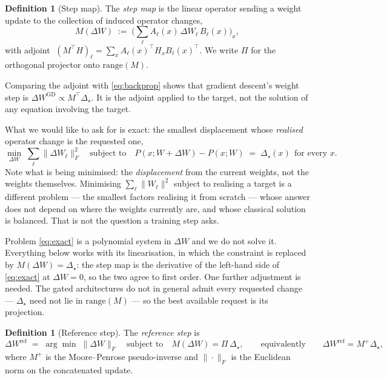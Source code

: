 \documentclass{article} %
\theoremstyle{plain}
\theoremstyle{definition}
\newtheorem{definition}[theorem]{Definition}
\theoremstyle{remark}
\begin{document}
\begin{definition}[Step map]
The \emph{step map} is the linear operator sending a weight update to the collection of induced
operator changes,
\begin{equation}
  M(\Delta W) \;:=\; \Big( \textstyle\sum_{\ell} A_\ell(x)\, \Delta W_\ell\, B_\ell(x) \Big)_x ,
  \label{eq:M}
\end{equation}
with adjoint $\;(M^\top H)_\ell = \sum_x A_\ell(x)^\top H_x B_\ell(x)^\top$. We write $\Pi$ for the
orthogonal projector onto $\mathrm{range}(M)$.
\end{definition}

Comparing the adjoint with \eqref{eq:backprop} shows that gradient descent's weight step is
$\Delta W^{\mathrm{GD}} \propto M^\top \Delta_\star$. It is the adjoint applied to the target, not
the solution of any equation involving the target.

What we would like to ask for is exact: the smallest displacement whose \emph{realised} operator
change is the requested one,
\begin{equation}
  \min_{\Delta W} \; \sum_\ell \|\Delta W_\ell\|_F^2
  \quad \text{subject to} \quad
  P(x; W + \Delta W) - P(x; W) \;=\; \Delta_\star(x) \ \ \text{for every } x .
  \label{eq:exact}
\end{equation}
Note what is being minimised: the \emph{displacement} from the current weights, not the weights
themselves. Minimising $\sum_\ell\|W_\ell\|^2$ subject to realising a target is a different
problem --- the smallest factors realising it from scratch --- whose answer does not depend on
where the weights currently are, and whose classical solution is balanced. That is not the
question a training step asks.

Problem \eqref{eq:exact} is a polynomial system in $\Delta W$ and we do not solve it. Everything
below works with its linearisation, in which the constraint is replaced by $M(\Delta W) =
\Delta_\star$: the step map is the derivative of the left-hand side of \eqref{eq:exact} at
$\Delta W = 0$, so the two agree to first order. One further adjustment is needed. The gated
architectures do not in general admit every requested change --- $\Delta_\star$ need not lie in
$\mathrm{range}(M)$ --- so the best available request is its projection.

\begin{definition}[Reference step]
\label{def:ref}
The \emph{reference step} is
\begin{equation}
  \Delta W^{\mathrm{ref}}
  \;=\; \arg\min \; \|\Delta W\|_F
  \quad \text{subject to} \quad
  M(\Delta W) = \Pi\,\Delta_\star ,
  \qquad\text{equivalently}\qquad
  \Delta W^{\mathrm{ref}} = M^{+} \Delta_\star ,
  \label{eq:ref}
\end{equation}
where $M^{+}$ is the Moore--Penrose pseudo-inverse and $\|\cdot\|_F$ is the Euclidean norm on the
concatenated update.
\end{definition}
\end{document}
